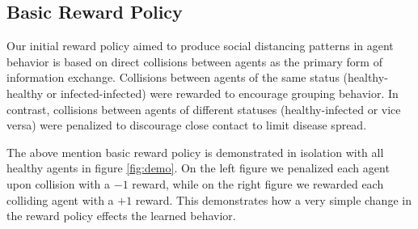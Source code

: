 \documentclass[9pt]{IEEEtran}
\begin{document}
\subsection{Basic Reward Policy}

Our initial reward policy aimed to produce social distancing patterns in agent behavior is based on direct collisions between agents as the primary form of information exchange. Collisions between agents of the same status (healthy-healthy or infected-infected) were rewarded to encourage grouping behavior. In contrast, collisions between agents of different statuses (healthy-infected or vice versa) were penalized to discourage close contact to limit disease spread.

The above mention basic reward policy is demonstrated in isolation with all healthy agents in figure \ref{fig:demo}. On the left figure we penalized each agent upon collision with a $-1$ reward, while on the right figure we rewarded each colliding agent with a $+1$ reward. This demonstrates how a very simple change in the reward policy effects the learned behavior.
\end{document}
